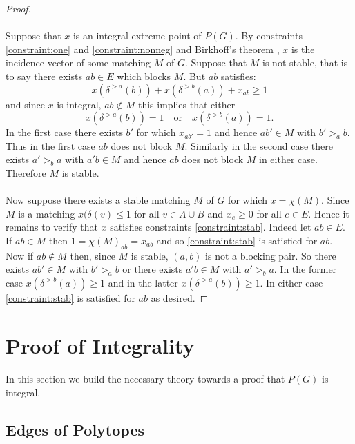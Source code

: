 \begin{proof}
\paragraph{}
Suppose that $x$ is an integral extreme point of $P(G)$. By constraints \ref{constraint:one} and \ref{constraint:nonneg} and Birkhoff's theorem \cite{birkhoff1946tres}, $x$ is the incidence vector of some matching $M$ of $G$. Suppose that $M$ is not stable, that is to say there exists $ab \in E$ which blocks $M$. But $ab$ satisfies:
$$x(\delta^{>a}(b)) + x(\delta^{>b}(a)) + x_{ab} \geq 1$$
and since $x$ is integral, $ab \not\in M$ this implies that either
$$x(\delta^{>a}(b)) = 1 \quad\text{or}\quad  x(\delta^{>b}(a)) = 1.$$
In the first case there exists $b'$ for which $x_{ab'} = 1$ and hence $ab' \in M$  with $b' >_a b$. Thus in the first case $ab$ does not block $M$. Similarly in the second case there exists $a' >_b a$ with $a'b \in M$ and hence $ab$ does not block $M$ in either case. Therefore $M$ is stable.
\paragraph{}
Now suppose there exists a stable matching $M$ of $G$ for which $x = \chi(M)$. Since $M$ is a matching $x(\delta(v) \leq 1$ for all $v \in A \cup B$ and $x_e \geq 0$ for all $e \in E$. Hence it remains to verify that $x$ satisfies constraints \ref{constraint:stab}. Indeed let $ab \in E$. If $ab \in M$ then $1 = \chi(M)_{ab} = x_{ab}$ and so \ref{constraint:stab} is satisfied for $ab$. Now if $ab \not\in M$ then, since $M$ is stable, $(a,b)$ is not a blocking pair. So there exists $ab' \in M$ with $b' >_a b$ or there exists $a'b \in M$ with $a' >_b a$. In the former case $x(\delta^{>b}(a)) \geq 1$ and in the latter $x(\delta^{>a}(b)) \geq 1$. In either case \ref{constraint:stab} is satisfied for $ab$ as desired.  
\end{proof}
\section{Proof of Integrality}
\paragraph{}
In this section we build the necessary theory towards a proof that $P(G)$ is integral.
\subsection{Edges of Polytopes}
